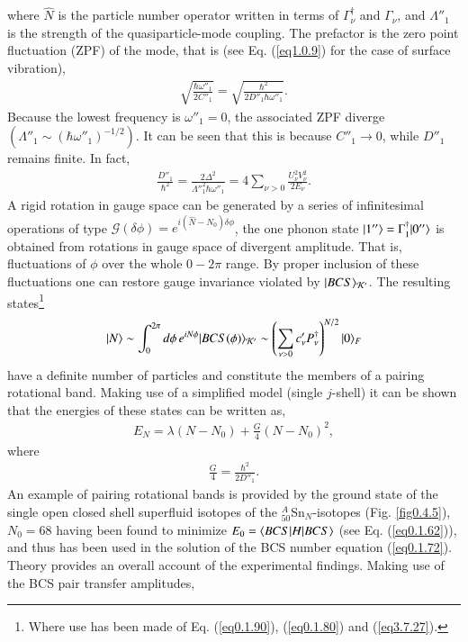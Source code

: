 where $\hat N$ is the particle number operator written in terms of $\Gamma^\dagger_\nu$ and $\Gamma_\nu$, and $\Lambda''_1$ is the strength of the quasiparticle-mode coupling. The prefactor is the zero point fluctuation (ZPF) of the mode, that is (see Eq. (\ref{eq1.0.9}) for the case of surface vibration),
\begin{align}\label{eq0.1.99}
\sqrt{\frac{\hbar\omega''_1}{2C''_1}}=\sqrt{\frac{\hbar^2}{2D''_1\hbar\omega''_1}}.
\end{align}
Because the lowest frequency is $\omega''_1=0$, the associated ZPF diverge $(\Lambda''_1\sim(\hbar\omega''_1)^{-1/2})$. It can be seen that this is because $C''_1\to0$, while $D''_1$ remains finite. In fact,
\begin{align}\label{eq0.1.100}
\frac{D''_1}{\hbar^2}=\frac{2\Delta^2}{\Lambda''^2_1\hbar\omega''_1}=4\sum_{\nu>0}\frac{U^2_\nu V^2_\nu}{2E_\nu}.
\end{align}
 A rigid rotation in gauge space can be generated by a series of infinitesimal operations of type $\mathcal G(\delta\phi)=e^{i(\hat N-N_0)\delta\phi}$, the one phonon state $|{1''} \rangle=\Gamma^\dagger_1|{0''} \rangle$ is obtained from rotations in gauge space of divergent amplitude. That is, fluctuations of $\phi$ over the whole $0-2\pi$ range. By proper inclusion of these fluctuations one can restore gauge invariance violated by $|{BCS} \rangle_{\mathcal K'}$. The resulting states\footnote{Where use has been made of Eq. (\ref{eq0.1.90}), (\ref{eq0.1.80}) and (\ref{eq3.7.27}).}
\begin{align}\label{eq0.1.101}
|{N} \rangle\sim\int^{2\pi}_0d\phi\,e^{iN\phi}|{BCS(\phi)} \rangle_{\mathcal K'}\sim\left(\sum_{\nu>0}c'_\nu P^\dagger_\nu\right)^{N/2}|{0} \rangle_F
\end{align}
have a definite number of particles and constitute the members of a pairing rotational band. Making use of a simplified model (single $j$-shell) it can be shown that the energies of these states can be written as,
\begin{align}\label{eq0.1.102}
E_N=\lambda(N-N_0)+\frac{G}{4}\left(N-N_0\right)^2,
\end{align}
where 
\begin{align}\label{eq0.1.103}
\frac{G}{4}=\frac{\hbar^2}{2D''_1}.
\end{align}
An example of pairing rotational bands is provided by the ground state of the single open closed shell superfluid isotopes of the $^A_{50}$Sn$_N$-isotopes (Fig. \ref{fig0.4.5}), $N_0=68$ having been found to minimize $E_0=\langle {BCS|H|BCS} \rangle$ (see Eq. (\ref{eq0.1.62})), and thus has been used in the solution of the BCS number equation (\ref{eq0.1.72}). Theory provides an overall account of the experimental findings. Making use of the BCS pair transfer amplitudes,
